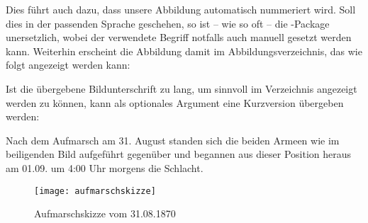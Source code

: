 Dies führt auch dazu, dass unsere Abbildung automatisch nummeriert wird.
Soll dies in der passenden Sprache geschehen, so ist -- wie so oft -- die -Package unersetzlich, wobei der verwendete Begriff notfalls auch manuell gesetzt werden kann.
Weiterhin erscheint die Abbildung damit im Abbildungsverzeichnis, das wie folgt angezeigt werden kann:
\begin{latexlisting}
	\listoffigures
\end{latexlisting}
Ist die übergebene Bildunterschrift zu lang, um sinnvoll im Verzeichnis angezeigt werden zu können, kann als optionales Argument eine Kurzversion übergeben werden:
\begin{latexlisting}
	Nach dem Aufmarsch am 31. August standen sich die beiden Armeen wie im beiligenden Bild aufgeführt gegenüber und begannen aus dieser Position heraus am 01.09. um 4:00 Uhr morgens die Schlacht.

	\begin{figure}
		\texttt{[image: aufmarschskizze]}		
		\caption[Aufmarschskizze]{Aufmarschskizze vom 31.08.1870}
	\end{figure}
\end{latexlisting}

